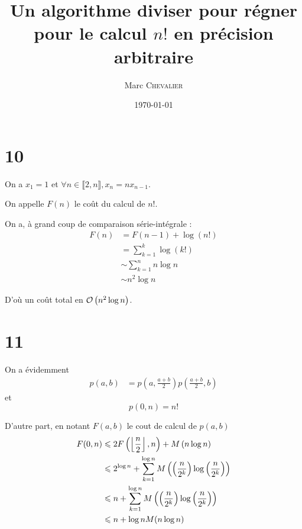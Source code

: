 

\title{Un algorithme diviser pour régner pour le calcul \texorpdfstring{$n!$}{n!} en précision arbitraire}
\author{
    Marc \textsc{Chevalier}
}
\date{\today}


\maketitle

\section*{10}

On a $x_1 = 1$ et $\forall n\in \llbracket 2,n\rrbracket, x_n = n x_{n-1}$.

On appelle $F(n)$ le coût du calcul de $n!$.

On a, à grand coup de comparaison série-intégrale :
\[
    \begin{aligned}
        F(n) &= F(n-1) + \log(n!)\\
        &= \sum\limits_{k=1}^k \log(k!)\\
        &\sim \sum\limits_{k=1}^n n \log n\\
        &\sim n^2\log n
    \end{aligned}
\]

D'où un coût total en $\mathcal O \left( n^2\log n \right)$.

\section*{11}

On a évidemment
\[
    \begin{aligned}
        p(a, b) &= p\left(a, \frac{a+b}{2}\right)p\left(\frac{a+b}{2}, b\right)
    \end{aligned}
\]
et
\[
    p(0,n) = n!
\]

D'autre part, en notant $F(a, b)$ le cout de calcul de $p(a, b)$
\[
    \begin{aligned}
        F(0,n) &\leqslant 2F\left(\left \lfloor \frac{n}{2} \right \rfloor, n\right) + M\left(n \log n\right)\\
        &\leqslant 2^{\log n} + \sum\limits_{k=1}^{\log n} M\left(\left(\frac{n}{2^k}\right)\log\left(\frac{n}{2^k}\right)\right)\\
        &\leqslant n + \sum\limits_{k=1}^{\log n} M\left(\left(\frac{n}{2^k}\right)\log\left(\frac{n}{2^k}\right)\right)\\
        &\leqslant n + \log nM(n \log n)
    \end{aligned}
\]

